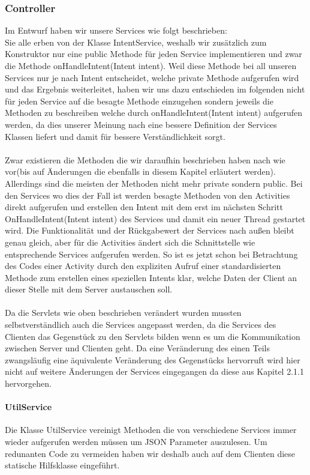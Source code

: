\documentclass{scrartcl}
\begin{document}
	\subsubsection{Controller}
	Im Entwurf haben wir unsere Services wie folgt beschrieben: 
\\
Sie alle erben von der Klasse IntentService, weshalb wir zusätzlich zum Konstruktor nur eine public Methode für jeden Service implementieren und zwar die Methode onHandleIntent(Intent intent). Weil diese Methode bei all unseren Services nur je nach Intent entscheidet, welche private Methode aufgerufen wird und das Ergebnis weiterleitet, haben wir uns dazu entschieden im folgenden nicht für jeden Service auf die besagte Methode einzugehen sondern jeweils die Methoden zu beschreiben welche durch onHandleIntent(Intent intent) aufgerufen werden, da dies unserer Meinung nach eine bessere Definition der Services Klassen liefert und damit für bessere Verständlichkeit sorgt.
\\
\\
Zwar existieren die Methoden die wir daraufhin beschrieben haben nach wie vor(bis auf Änderungen die ebenfalls in diesem Kapitel erläutert werden).
Allerdings sind die meisten der Methoden nicht mehr private sondern public. Bei den Services wo dies der Fall ist werden besagte Methoden von den Activities direkt aufgerufen und erstellen den Intent mit dem erst im nächsten Schritt OnHandleIntent(Intent intent) des Services und damit ein neuer Thread gestartet wird. 
Die Funktionalität und der Rückgabewert der Services nach außen bleibt genau gleich, aber für die Activities ändert sich die Schnittstelle wie entsprechende Services aufgerufen werden.
So ist es jetzt schon bei Betrachtung des Codes einer Activity durch den expliziten Aufruf einer standardisierten Methode zum erstellen eines speziellen Intents klar, welche Daten der Client an dieser Stelle mit dem Server austauschen soll.    
\\
\\
Da die Servlets wie oben beschrieben verändert wurden mussten selbstverständlich auch die Services angepasst werden, da die Services des Clienten das Gegenstück zu den Servlets bilden wenn es um die Kommunikation zwischen Server und Clienten geht.
Da eine Veränderung des einen Teils zwangsläufig eine äquivalente Veränderung des Gegenstücks hervorruft wird hier nicht auf weitere Änderungen der Services eingegangen da diese aus Kapitel 2.1.1 hervorgehen.

\paragraph{UtilService} Die Klasse UtilService vereinigt Methoden die von verschiedene Services immer wieder aufgerufen werden müssen um JSON Parameter auszulesen. Um redunanten Code zu vermeiden haben wir deshalb auch auf dem Clienten diese statische Hilfsklasse eingeführt.  	
\end{document}
